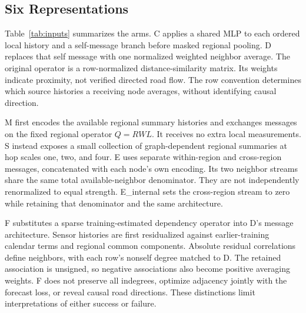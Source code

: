 \documentclass{llncs}
\begin{document}
\subsection{Six Representations}
Table~\ref{tab:inputs} summarizes the arms. C applies a shared MLP to each ordered local history and a self-message branch before masked regional pooling. D replaces that self message with one normalized weighted neighbor average. The original operator is a row-normalized distance-similarity matrix. Its weights indicate proximity, not verified directed road flow. The row convention determines which source histories a receiving node averages, without identifying causal direction.

M first encodes the available regional summary histories and exchanges messages on the fixed regional operator $Q=RWL$. It receives no extra local measurements. S instead exposes a small collection of graph-dependent regional summaries at hop scales one, two, and four. E uses separate within-region and cross-region messages, concatenated with each node's own encoding. Its two neighbor streams share the same total available-neighbor denominator. They are not independently renormalized to equal strength. E\_internal sets the cross-region stream to zero while retaining that denominator and the same architecture.

F substitutes a sparse training-estimated dependency operator into D's message architecture. Sensor histories are first residualized against earlier-training calendar terms and regional common components. Absolute residual correlations define neighbors, with each row's nonself degree matched to D. The retained association is unsigned, so negative associations also become positive averaging weights. F does not preserve all indegrees, optimize adjacency jointly with the forecast loss, or reveal causal road directions. These distinctions limit interpretations of either success or failure.
\end{document}
